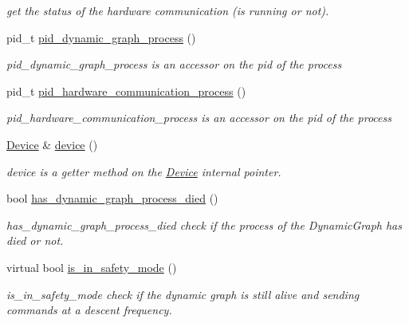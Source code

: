 \begin{DoxyCompactItemize}
\begin{DoxyCompactList}\small\item\em get the status of the hardware communication (is running or not). \end{DoxyCompactList}\item 
pid\+\_\+t \hyperlink{classdynamic__graph_1_1DynamicGraphManager_a9c11927e0b76e91fabc4b34ea7fb85bc}{pid\+\_\+dynamic\+\_\+graph\+\_\+process} ()
\begin{DoxyCompactList}\small\item\em pid\+\_\+dynamic\+\_\+graph\+\_\+process is an accessor on the pid of the process \end{DoxyCompactList}\item 
pid\+\_\+t \hyperlink{classdynamic__graph_1_1DynamicGraphManager_ac1abb11591e037e203329e900c89f4f5}{pid\+\_\+hardware\+\_\+communication\+\_\+process} ()
\begin{DoxyCompactList}\small\item\em pid\+\_\+hardware\+\_\+communication\+\_\+process is an accessor on the pid of the process \end{DoxyCompactList}\item 
\hyperlink{classdynamic__graph_1_1Device}{Device} \& \hyperlink{classdynamic__graph_1_1DynamicGraphManager_a90bb14375da3d2aaaeafb356b6ca54f7}{device} ()
\begin{DoxyCompactList}\small\item\em device is a getter method on the \hyperlink{classdynamic__graph_1_1Device}{Device} internal pointer. \end{DoxyCompactList}\item 
bool \hyperlink{classdynamic__graph_1_1DynamicGraphManager_ab980a2384c817ab5f59e712a54b2261a}{has\+\_\+dynamic\+\_\+graph\+\_\+process\+\_\+died} ()
\begin{DoxyCompactList}\small\item\em has\+\_\+dynamic\+\_\+graph\+\_\+process\+\_\+died check if the process of the Dynamic\+Graph has died or not. \end{DoxyCompactList}\item 
virtual bool \hyperlink{classdynamic__graph_1_1DynamicGraphManager_aea29e8dc351e0a50a8d2803d854d238d}{is\+\_\+in\+\_\+safety\+\_\+mode} ()
\begin{DoxyCompactList}\small\item\em is\+\_\+in\+\_\+safety\+\_\+mode check if the dynamic graph is still alive and sending commands at a descent frequency. \end{DoxyCompactList}\end{DoxyCompactItemize}
